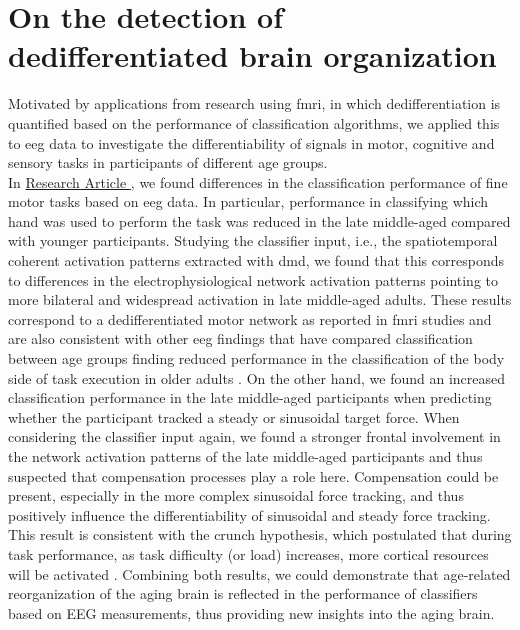 \section{On the detection of dedifferentiated brain organization}
Motivated by applications from research using \gls{fmri}, in which dedifferentiation is quantified based on the performance of classification algorithms, we applied this to \gls{eeg} data to investigate the differentiability of signals in motor, cognitive and sensory tasks in participants of different age groups.\\
In \hyperref[results:paperI]{Research Article }, we found differences in the classification performance of fine motor tasks based on \gls{eeg} data. In particular, performance in classifying which hand was used to perform the task was reduced in the late middle-aged compared with younger participants. Studying the classifier input, i.e., the spatiotemporal coherent activation patterns extracted with \gls{dmd}, we found that this corresponds to differences in the electrophysiological network activation patterns pointing to more bilateral and widespread activation in late middle-aged adults. These results correspond to a dedifferentiated motor network as reported in \gls{fmri} studies \cite{Carb2011, Cassedy2020} and are also consistent with other \gls{eeg} findings that have compared classification between age groups finding reduced performance in the classification of the body side of task execution in older adults \cite{Chen2019, Zich2015}. On the other hand, we found an increased classification performance in the late middle-aged participants when predicting whether the participant tracked a steady or sinusoidal target force. When considering the classifier input again, we found a stronger frontal involvement in the network activation patterns of the late middle-aged participants and thus suspected that compensation processes play a role here. Compensation could be present,  especially in the more complex sinusoidal force tracking, and thus positively influence the differentiability of sinusoidal and steady force tracking. This result is consistent with the \gls{crunch} hypothesis, which postulated that during task performance, as task difficulty (or load) increases, more cortical resources will be activated \cite{Festini2018}. Combining both results, we could demonstrate that age-related reorganization of the aging brain is reflected in the performance of classifiers based on EEG measurements, thus providing new insights into the aging brain.\\
